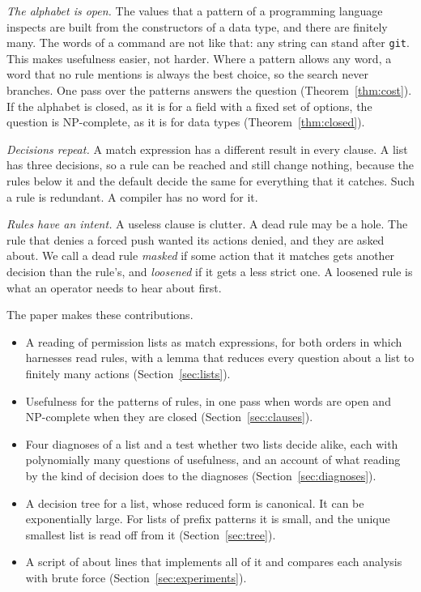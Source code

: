 \documentclass[acmsmall,nonacm,screen]{acmart}
\begin{document}
\emph{The alphabet is open.} The values that a pattern of a programming language inspects are
built from the constructors of a data type, and there are finitely many. The words of a
command are not like that: any string can stand after \texttt{git}. This makes usefulness
easier, not harder. Where a pattern allows any word, a word that no rule mentions is always
the best choice, so the search never branches. One pass over the patterns answers the
question (Theorem~\ref{thm:cost}). If the alphabet is closed, as it is for a field with a
fixed set of options, the question is NP-complete, as it is for data types
(Theorem~\ref{thm:closed}).

\emph{Decisions repeat.} A match expression has a different result in every clause. A list
has three decisions, so a rule can be reached and still change nothing, because the rules
below it and the default decide the same for everything that it catches. Such a rule is
redundant. A compiler has no word for it.

\emph{Rules have an intent.} A useless clause is clutter. A dead rule may be a hole. The rule
that denies a forced push wanted its actions denied, and they are asked about. We call a dead
rule \emph{masked} if some action that it matches gets another decision than the rule's, and
\emph{loosened} if it gets a less strict one. A loosened rule is what an operator needs to
hear about first.

The paper makes these contributions.
\begin{itemize}
\item A reading of permission lists as match expressions, for both orders in which harnesses
  read rules, with a lemma that reduces every question about a list to finitely many actions
  (Section~\ref{sec:lists}).
\item Usefulness for the patterns of rules, in one pass when words are open and NP-complete
  when they are closed (Section~\ref{sec:clauses}).
\item Four diagnoses of a list and a test whether two lists decide alike, each with
  polynomially many questions of usefulness, and an account of what reading by the kind of
  decision does to the diagnoses (Section~\ref{sec:diagnoses}).
\item A decision tree for a list, whose reduced form is canonical. It can be exponentially
  large. For lists of prefix patterns it is small, and the unique smallest list is read off
  from it (Section~\ref{sec:tree}).
\item A script of about \exSize{} lines that implements all of it and compares each analysis
  with brute force (Section~\ref{sec:experiments}).
\end{itemize}
\end{document}
